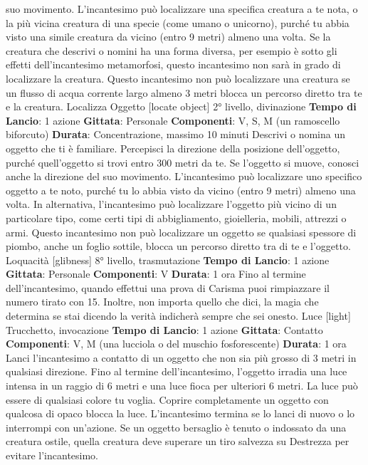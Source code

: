 \begin{multicols}{2}
suo movimento.
L’incantesimo può localizzare una specifica creatura a
te nota, o la più vicina creatura di una specie (come
umano o unicorno), purché tu abbia visto una simile
creatura da vicino (entro 9 metri) almeno una volta. Se
la creatura che descrivi o nomini ha una forma diversa,
per esempio è sotto gli effetti dell’incantesimo
metamorfosi, questo incantesimo non sarà in grado di
localizzare la creatura.
Questo incantesimo non può localizzare una creatura
se un flusso di acqua corrente largo almeno 3 metri
blocca un percorso diretto tra te e la creatura.
Localizza Oggetto
[locate object]
2° livello, divinazione
\textbf{Tempo di Lancio}: 1 azione
\textbf{Gittata}: Personale
\textbf{Componenti}: V, S, M (un ramoscello biforcuto)
\textbf{Durata}: Concentrazione, massimo 10 minuti
Descrivi o nomina un oggetto che ti è familiare.
Percepisci la direzione della posizione dell’oggetto,
purché quell’oggetto si trovi entro 300 metri da te. Se
l’oggetto si muove, conosci anche la direzione del suo
movimento.
L’incantesimo può localizzare uno specifico oggetto a te
noto, purché tu lo abbia visto da vicino (entro 9 metri)
almeno una volta. In alternativa, l’incantesimo può
localizzare l’oggetto più vicino di un particolare tipo,
come certi tipi di abbigliamento, gioielleria, mobili,
attrezzi o armi.
Questo incantesimo non può localizzare un oggetto se
qualsiasi spessore di piombo, anche un foglio sottile,
blocca un percorso diretto tra di te e l’oggetto.
Loquacità
[glibness]
8° livello, trasmutazione
\textbf{Tempo di Lancio}: 1 azione
\textbf{Gittata}: Personale
\textbf{Componenti}: V
\textbf{Durata}: 1 ora
Fino al termine dell’incantesimo, quando effettui una
prova di Carisma puoi rimpiazzare il numero tirato con
15. Inoltre, non importa quello che dici, la magia che
determina se stai dicendo la verità indicherà sempre
che sei onesto.
Luce
[light]
Trucchetto, invocazione
\textbf{Tempo di Lancio}: 1 azione
\textbf{Gittata}: Contatto
\textbf{Componenti}: V, M (una lucciola o del muschio
fosforescente)
\textbf{Durata}: 1 ora
Lanci l’incantesimo a contatto di un oggetto che non sia
più grosso di 3 metri in qualsiasi direzione. Fino al
termine dell’incantesimo, l’oggetto irradia una luce
intensa in un raggio di 6 metri e una luce fioca per
ulteriori 6 metri. La luce può essere di qualsiasi colore
tu voglia. Coprire completamente un oggetto con
qualcosa di opaco blocca la luce. L’incantesimo termina
se lo lanci di nuovo o lo interrompi con un’azione.
Se un oggetto bersaglio è tenuto o indossato da una
creatura ostile, quella creatura deve superare un tiro
salvezza su Destrezza per evitare l’incantesimo.

\end{multicols}
